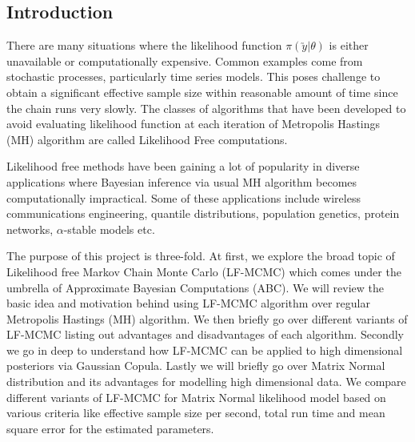 
\begin{multicols}{2} %

\section{Introduction} 
\label{sec:introduction}
There are many situations where the likelihood function $\pi(\utilde{y}|\theta)$ is either unavailable or computationally expensive. Common examples come from stochastic processes, particularly time series models. This poses challenge to obtain a significant effective sample size within reasonable amount of time since the chain runs very slowly. The classes of algorithms that have been developed to avoid evaluating likelihood function at each iteration of Metropolis Hastings (MH) algorithm are called Likelihood Free computations\cite{brooks2011handbook, beaumont2002approximate, marjoram2003markov, ratmann2009model, sisson2007sequential}.

Likelihood free methods have been gaining a lot of popularity in diverse applications where Bayesian inference via usual MH algorithm becomes computationally impractical\cite{brooks2011handbook}. Some of these applications include wireless communications engineering, quantile distributions, population genetics, protein networks, $\alpha$-stable models etc\cite{brooks2011handbook}.

The purpose of this project is three-fold. At first, we explore the broad topic of Likelihood free Markov Chain Monte Carlo (LF-MCMC) which comes under the umbrella of Approximate Bayesian Computations (ABC). We will review the basic idea and motivation behind using LF-MCMC algorithm over regular Metropolis Hastings (MH) algorithm\cite{brooks2011handbook}. We then briefly go over different variants of LF-MCMC listing out advantages and disadvantages of each algorithm. Secondly we go in deep to understand how LF-MCMC can be applied to high dimensional posteriors via Gaussian Copula. Lastly we will briefly go over Matrix Normal distribution and its advantages for modelling high dimensional data. We compare different variants of LF-MCMC for Matrix Normal likelihood model based on various criteria like effective sample size per second, total run time and mean square error for the estimated parameters\cite{li2015extending}.


\end{multicols}
